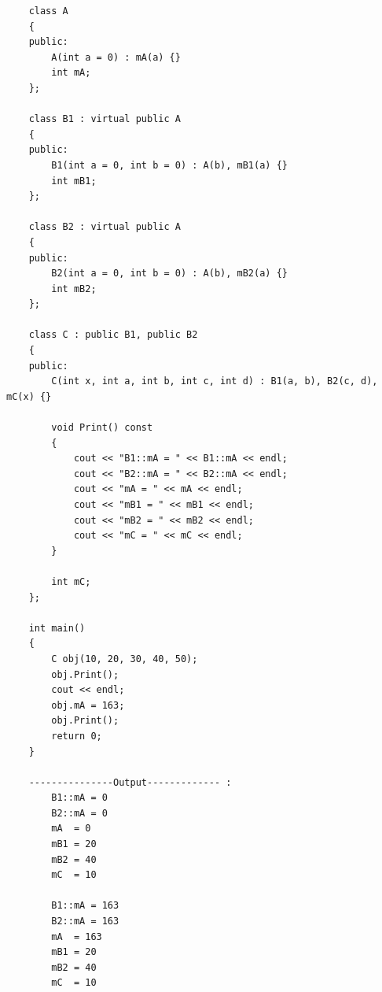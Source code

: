 \documentclass[UTF8,a4paper,12pt]{ctexbook} %
\begin{document}
		        \begin{lstlisting}
	class A
	{
	public:
		A(int a = 0) : mA(a) {}
		int mA;
	};
	
	class B1 : virtual public A
	{
	public:
		B1(int a = 0, int b = 0) : A(b), mB1(a) {}
		int mB1;
	};
	
	class B2 : virtual public A
	{
	public:
		B2(int a = 0, int b = 0) : A(b), mB2(a) {}
		int mB2;
	};
	
	class C : public B1, public B2
	{
	public:
		C(int x, int a, int b, int c, int d) : B1(a, b), B2(c, d), mC(x) {}
		
		void Print() const
		{
			cout << "B1::mA = " << B1::mA << endl;
			cout << "B2::mA = " << B2::mA << endl;
			cout << "mA = " << mA << endl;
			cout << "mB1 = " << mB1 << endl;
			cout << "mB2 = " << mB2 << endl;
			cout << "mC = " << mC << endl;
		}
		
		int mC;
	};
	
	int main()
	{
		C obj(10, 20, 30, 40, 50);
		obj.Print();
		cout << endl;
		obj.mA = 163;
		obj.Print();
		return 0;
	}
	
	---------------Output------------- :
		B1::mA = 0
		B2::mA = 0
		mA  = 0
		mB1 = 20
		mB2 = 40
		mC  = 10
		
		B1::mA = 163
		B2::mA = 163
		mA  = 163
		mB1 = 20
		mB2 = 40
		mC  = 10	       	
		        \end{lstlisting} 
        
\end{document}
